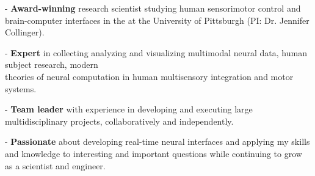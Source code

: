 \vspace*{-0.5cm}

\begin{cvparagraph}
- \textbf{Award-winning} research scientist studying human sensorimotor control and brain-computer interfaces in the  at the University of Pittsburgh (PI: Dr. Jennifer Collinger). 

- \textbf{Expert} in collecting analyzing and visualizing multimodal neural data, human subject research, modern \\ theories of neural computation in human multisensory integration and motor systems.

- \textbf{Team leader} with experience in developing and executing large multidisciplinary projects, collaboratively and independently.

- \textbf{Passionate} about developing real-time neural interfaces and applying my skills and knowledge to interesting and important questions while continuing to grow as a scientist and engineer.
\vspace*{-0.6cm}
\end{cvparagraph}
